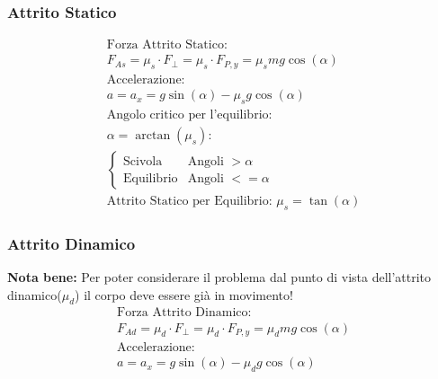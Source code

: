 \subsubsection{Attrito Statico}
\begin{gather*}
    \text{Forza Attrito Statico: } \\ F_{As} = \mu_s \cdot F_\perp = \mu_s \cdot F_{P, y} = \mu_s m g \cos (\alpha) \\
    \text{Accelerazione: } \\ a = a_x = g \sin (\alpha) - \mu_s g \cos (\alpha) \\
    \text{Angolo critico per l'equilibrio: } \\ \alpha = \arctan (\mu_s) : \\
    \begin{cases}
        \text{Scivola} & \text{Angoli } > \alpha \\
        \text{Equilibrio} & \text{Angoli } <= \alpha
    \end{cases}    \\
    \text{Attrito Statico per Equilibrio: } \mu_s = \tan (\alpha)
\end{gather*}
\subsubsection{Attrito Dinamico}
\textbf{Nota bene: } Per poter considerare il problema dal punto di vista dell'attrito dinamico($\mu_d$) il corpo deve essere già in movimento!
\begin{gather*}
    \text{Forza Attrito Dinamico:} \\ F_{Ad} = \mu_d \cdot F_\perp = \mu_d \cdot F_{P, y} = \mu_d m g \cos (\alpha) \\
    \text{Accelerazione: } \\ a = a_x = g \sin (\alpha) - \mu_d g \cos (\alpha)
\end{gather*}